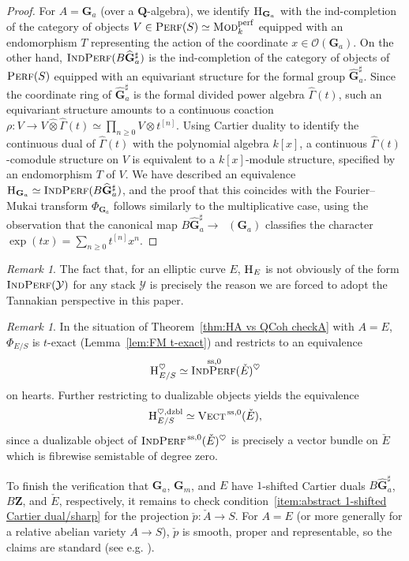\documentclass[12pt, oneside]{amsart}
\numberwithin{equation}{section}
\theoremstyle{remark}
\newtheorem{remark}[subsubsection]{Remark}
\theoremstyle{plain}
\renewcommand{\ge}{\geqslant}
\newcommand{\Mod}{\textsc{Mod}}
\DeclareMathOperator{\Perf}{\textsc{Perf}}
\DeclareMathOperator{\IndPerf}{\textsc{IndPerf}}
\newcommand{\Hcat}{\textup{\textsc{H}}}
\newcommand{\HE}{\Hcat_E}
\DeclareMathOperator{\CharOne}{\chi^{(1)}}
\newcommand{\OO}{\mathcal{O}}
\newcommand{\YY}{\mathcal{Y}}
\newcommand{\GGhat}{\widehat{\mathbf{G}}}
\newcommand{\GGa}{\mathbf{G}_{a}}
\newcommand{\GGm}{\mathbf{G}_{m}}
\newcommand{\bZ}{\mathbf{Z}}
\newcommand{\bQ}{\mathbf{Q}}
\renewcommand{\ss}{\mathrm{ss}}
\begin{document}
\begin{proof}
  For $A=\GGa$ (over a $\bQ$-algebra), we identify $\Hcat_{\GGa}$ with the ind-completion of the category of objects $V \in \Perf(S)\simeq \Mod_{k}^{\mathrm{perf}}$ equipped with an endomorphism $T$ representing the action of the coordinate $x \in \OO(\GGa)$.
  On the other hand, $\IndPerf(B\GGhat_{a}^\sharp)$ is the ind-completion of the category of objects of $\Perf(S)$ equipped with an equivariant structure for the formal group $\GGhat_{a}^\sharp$.
  Since the coordinate ring of $\GGhat_{a}^\sharp$ is the formal divided power algebra $\widehat{\Gamma}(t)$, such an equivariant structure amounts to a continuous coaction $\rho : V \to V \widehat{\otimes} \widehat{\Gamma}(t) \simeq \prod_{n \ge 0} V \otimes t^{[n]}$.
  Using Cartier duality to identify the continuous dual of $\widehat{\Gamma}(t)$ with the polynomial algebra $k[x]$, a continuous $\widehat{\Gamma}(t)$-comodule structure on $V$ is equivalent to a $k[x]$-module structure, specified by an endomorphism $T$ of $V$.
  We have described an equivalence $\Hcat_{\GGa} \simeq \IndPerf(B\GGhat_{a}^\sharp)$, and the proof that this coincides with the Fourier--Mukai transform $\Phi_{\GGa}$ follows similarly to the multiplicative case, using the observation that the canonical map $B\GGhat_{a}^\sharp \to \CharOne(\GGa)$ classifies the character $\exp(tx) = \sum_{n \ge 0} t^{[n]} x^n$.
\end{proof}

\begin{remark} The fact that, for an elliptic curve $E$, $\HE$ is not obviously of the form $\IndPerf(\YY)$ for any stack $\YY$ is precisely the reason we are forced to adopt the Tannakian perspective in this paper. \end{remark}

\begin{remark}\label{rem:HA vs QCoh checkA dzbl}
  In the situation of Theorem~\ref{thm:HA vs QCoh checkA} with $A=E$, $\Phi_{E/S}$ is $t$-exact (Lemma~\ref{lem:FM t-exact}) and restricts to an equivalence
  \[ \Hcat_{E/S}^{\heartsuit} \simeq \IndPerf^{\,\ss,0}(\check{E})^{\heartsuit} \]
  on hearts.
  Further restricting to dualizable objects yields the equivalence
  \[ \Hcat_{E/S}^{\heartsuit,\mathrm{dzbl}} \simeq \operatorname{\textsc{Vect}^{\,\ss,0}}(\check{E}), \]
  since a dualizable object of $\IndPerf^{\,\ss,0}(\check{E})^{\heartsuit}$ is precisely a vector bundle on $\check{E}$ which is fibrewise semistable of degree zero.
\end{remark}

To finish the verification that $\GGa$, $\GGm$, and $E$ have $1$-shifted Cartier duals $B\GGhat_{a}^\sharp$, $B\bZ$, and $\check{E}$, respectively, it remains to check condition~\ref{item:abstract 1-shifted Cartier dual/sharp} for the projection $\check{p} : \check{A} \to S$.
For $A=E$ (or more generally for a relative abelian variety $A \to S$), $\check{p}$ is smooth, proper and representable, so the claims are standard (see e.g. \cite[Exam.~A.7]{weilres}).
\end{document}
